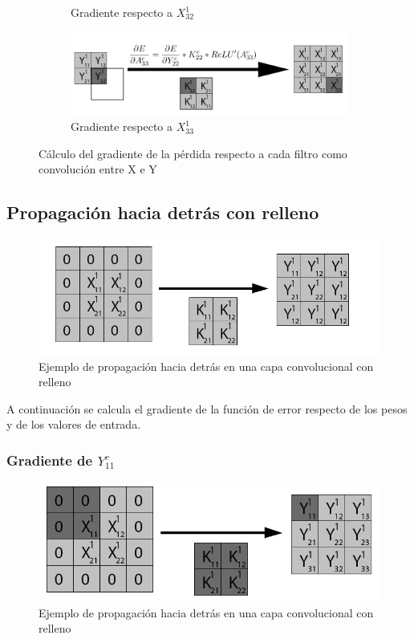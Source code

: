 \begin{figure}[H]
\begin{subfigure}{.5\textwidth}
		\caption{Gradiente respecto a $X^1_{32}$}
	\end{subfigure}
		\vspace{5mm}
	\begin{subfigure}{.5\textwidth}
		\hspace{-25mm}
		\includegraphics[width=1.4\linewidth]{imagenes/conv_back_entrada_9.jpg}  
		\caption{Gradiente respecto a $X^1_{33}$}
	\end{subfigure}
	\caption{Cálculo del gradiente de la pérdida respecto a cada filtro como convolución entre X e Y}
	\label{fig:conv_backprop_como_convolucion_Y_W}
\end{figure}

\subsection{Propagación hacia detrás con relleno}

\begin{figure}[H]
	\centering
	\includegraphics[width=0.8\linewidth]{imagenes/conv_back_padding_intro.jpg} 
	\caption{Ejemplo de propagación hacia detrás en una capa convolucional con relleno}
	\label{fig:conv_back_padding_intro}
\end{figure}

A continuación se calcula el gradiente de la función de error respecto de los pesos y de los valores de entrada.

\subsubsection{Gradiente de $Y^c_{11}$}

\begin{figure}[H]
	\centering
	\includegraphics[width=0.8\linewidth]{imagenes/conv_back_padding_1.jpg} 
	\caption{Ejemplo de propagación hacia detrás en una capa convolucional con relleno}
\end{figure}

